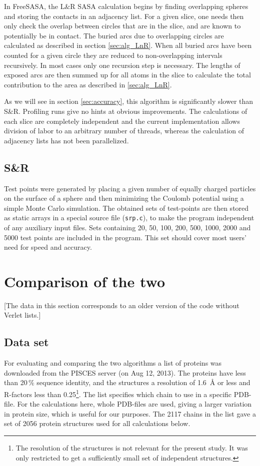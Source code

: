 \documentclass[a4paper,11pt]{article}
\begin{document}
\begin{small}
In FreeSASA, the L\&R SASA calculation begins by finding overlapping
spheres and storing the contacts in an adjacency list. For a given
slice, one needs then only check the overlap between circles that are
in the slice, and are known to potentially be in contact. The buried
arcs due to overlapping circles are calculated as described in section
\ref{sec:alg_LnR}. When all buried arcs have been counted for a given
circle they are reduced to non-overlapping intervals recursively. In
most cases only one recursion step is necessary. The lengths of
exposed arcs are then summed up for all atoms in the slice to
calculate the total contribution to the area as described in
\ref{sec:alg_LnR}.

As we will see in section \ref{sec:accuracy}, this algorithm is
significantly slower than S\&R. Profiling runs give no hints at
obvious improvements. The calculations of each slice are completely
independent and the current implementation allows division of labor to
an arbitrary number of threads, whereas the calculation of adjacency
lists has not been parallelized.

\subsection{S\&R}

Test points were generated by placing a given number of equally
charged particles on the surface of a sphere and then minimizing the
Coulomb potential using a simple Monte Carlo simulation. The obtained
sets of test-points are then stored as static arrays in a special
source file (\texttt{srp.c}), to make the program independent of any
auxiliary input files. Sets containing 20, 50, 100, 200, 500, 1000,
2000 and 5000 test points are included in the program. This set should
cover most users' need for speed and accuracy.

\section{Comparison of the two}\label{sec:compare}

[The data in this section corresponds to an older version of the code
  without Verlet lists.]

\subsection{Data set}\label{sec:dataset}

For evaluating and comparing the two algorithms a list of proteins was
downloaded from the PISCES server \cite{PISCES} (on Aug 12, 2013). The
proteins have less than 20\,\% sequence identity, and the structures a
resolution of 1.6~Å or less and R-factors less than 0.25\footnote{The
  resolution of the structures is not relevant for the present
  study. It was only restricted to get a sufficiently small set of
  independent structures.}. The list specifies which chain to use in a
specific PDB-file. For the calculations here, whole PDB-files are
used, giving a larger variation in protein size, which is useful for
our purposes. The 2117 chains in the list gave a set of 2056 protein
structures used for all calculations below.


\end{small}
\end{document}
